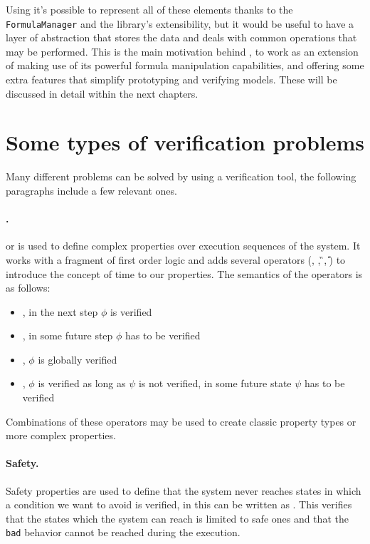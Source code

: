 Using \pysmt{} it's possible to represent all of these elements thanks to the \texttt{FormulaManager} and the library's extensibility, but it would be useful to have a layer of abstraction that stores the data and deals with common operations that may be performed.
This is the main motivation behind \pyvmt{}, to work as an extension of \pysmt{} making use of its powerful formula manipulation capabilities, and offering some extra features that simplify prototyping and verifying models. These will be discussed in detail within the next chapters.


\section{Some types of verification problems}
Many different problems can be solved by using a verification tool, the following paragraphs include a few relevant ones.

\paragraph*{\ltl{}.} \ltl{} or \LTL{} is used to define complex properties over execution sequences of the system.
It works with a fragment of first order logic and adds several operators (\X{}, \F{}, \G{}, \U{}) to introduce the concept of time to our properties.
The semantics of the operators is as follows:
\begin{itemize}
    \item \fX{}, in the next step $\phi$ is verified
    \item \fF{}, in some future step $\phi$ has to be verified
    \item \fG{}, $\phi$ is globally verified
    \item \fU{}, $\phi$ is verified as long as $\psi$ is not verified, in some future state $\psi$ has to be verified
\end{itemize}

Combinations of these operators may be used to create classic property types or more complex properties.

\paragraph*{Safety.} Safety properties are used to define that the system never reaches states in which a condition we want to avoid is verified, in \ltl{} this can be written as \fsafe{}.
This verifies that the states which the system can reach is limited to safe ones and that the \texttt{bad} behavior cannot be reached during the execution.

